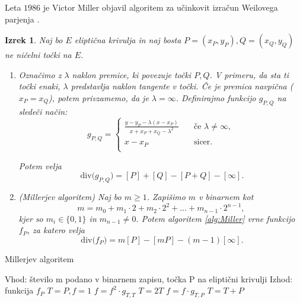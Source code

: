 \documentclass[12pt,a4paper,twoside]{article}
\theoremstyle{definition} %
\theoremstyle{plain} %
\newtheorem{izrek}[definicija]{Izrek}
\numberwithin{equation}{section}  %
\newcommand{\Div}[1]{\ \text{div(}{#1}\text{)}}
\begin{document}
Leta $1986$ je Victor Miller objavil algoritem za učinkovit izračun Weilovega parjenja \cite{Miller} .

\begin{izrek}
\label{izrek:Miller}
Naj bo $E$ eliptična krivulja in naj bosta $P=(x_P,y_P), Q = (x_Q,y_Q)$ ne ničelni točki na $E$.
\begin{enumerate}
\item Označimo z $\lambda$ naklon premice, ki povezuje točki $P,Q$. V primeru, da sta ti točki enaki, $\lambda$ predstavlja naklon tangente v točki. Če je premica navpična ($x_P = x_Q$), potem privzamemo, da je $\lambda = \infty$. Definirajmo funkcijo $g_{P,Q}$ na sledeči način:
\[ g_{P,Q} =
\begin{cases}
\frac{y-y_P-\lambda(x-x_P)}{x+x_P+x_Q-\lambda^2} & \quad \text{če } \lambda \neq \infty ,\\
x-x_P & \quad \text{sicer} .\\
\end{cases}
\]

Potem velja 
$$\Div{g_{P,Q}} = [P] + [Q] - [P+Q] - [\infty].$$


\item (Millerjev algoritem) Naj bo $m \geq 1$. Zapišimo $m$ v binarnem kot
$$m = m_0+m_1\cdot 2 + m_2\cdot 2^2 + \ldots + m_{n-1}\cdot 2^{n-1},$$
kjer so $m_i \in \{ 0,1 \}$ in $m_{n-1} \neq 0$. Potem algoritem \ref{alg:Miller} vrne
funkcijo $f_P$, za katero velja
$$\Div{f_P} = m[P]-[mP]-(m-1)[\infty].$$ 


\end{enumerate}


\end{izrek}

\begin{algorithm}[H]
\caption[Miller]{Millerjev algoritem}
\label{alg:Miller}

\begin{algorithmic}
\State Vhod: število m podano v binarnem zapisu, točka P na eliptični krivulji
\State Izhod: funkcija $f_P$
\State $T = P,f = 1$
	\State $f = f^2 \cdot g_{T,T}$
	\State $T = 2T$
		\State $f = f \cdot g_{T,P}$
		\State $T=T+P$
	\EndIf
	
\EndFor

\end{algorithmic}
\end{algorithm}
\end{document}
